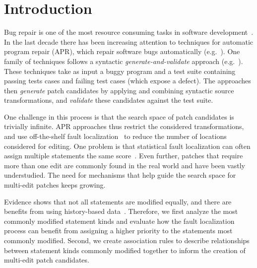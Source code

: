 \documentclass[sigconf]{acmart}
\begin{document}



\maketitle

\section{Introduction}

Bug repair is one of the most resource consuming tasks in 
software development~\cite{Weiss07,Tassey02,Britton13}.
In the last decade there has been increasing attention to 
techniques for automatic program repair (APR), which 
repair software bugs
automatically (e.g.~\cite{legoues12,kim2013,Weimer13,long16proph}).
One family of techniques follows a syntactic \emph{generate-and-validate}
approach (e.g.~\cite{legoues12,kim2013,Qi13TrpAutoR,xuan16}). These techniques
take as input a buggy program and a test suite containing
passing tests cases and failing test cases (which expose a defect).
The approaches then \emph{generate} 
patch candidates by applying and combining syntactic source transformations, and 
\emph{validate} these 
candidates against the test suite.

One challenge in this process is that the search space
of patch candidates is trivially infinite.  APR approaches thus restrict the
considered transformations, and use off-the-shelf fault
localization~\cite{legoues12} to reduce the number of locations considered for
editing. One problem is that 
statistical fault localization can often assign multiple statements
the same score~\cite{Jones02}. Even further, patches that require
more than one edit are commonly found in the real world and have
been vastly understudied. The need for mechanisms that help guide
the search space for multi-edit patches keeps growing.

Evidence shows that not all statements are modified
equally, and there are benefits from using history-based
data~\cite{kim2013,Soto18}. 
Therefore, we first analyze the most commonly 
modified statement kinds and evaluate how the 
fault localization process can benefit from assigning
a higher priority to the statements most commonly modified.
Second, we create association rules to describe relationships
between statement kinds commonly modified together to inform
the creation of multi-edit patch candidates. 
\end{document}
